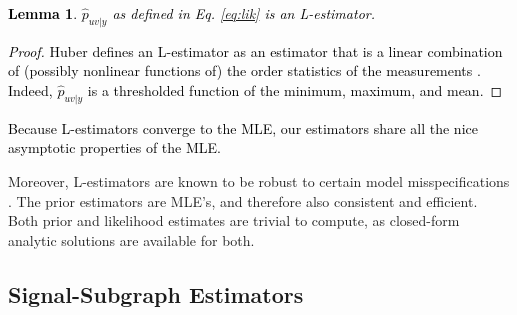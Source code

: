 \documentclass[10pt,journal,cspaper,compsoc]{IEEEtran}
\providecommand{\tk}[1]{\textcolor{black}{#1}}
\providecommand{\wh}[1]{\widehat{#1}}
\newcommand{\conv}{\rightarrow}
\newtheorem{Lem}{Lemma}[section]
\begin{document}
\tk{
\begin{Lem}
	$\wh{p}_{uv|y}$ as defined in Eq. \ref{eq:lik}  is an L-estimator.
\end{Lem}
% 
\begin{proof}
Huber defines an L-estimator as an estimator that is a linear combination of (possibly nonlinear functions of) the order statistics of the measurements \cite{Huber1981}.  Indeed, $\wh{p}_{uv|y}$ is a thresholded function of the minimum, maximum, and mean.
\end{proof}
% 
Because L-estimators converge to the MLE, our estimators share all the nice asymptotic properties of the MLE.  }
% 
% 
Moreover, L-estimators are known to be robust to certain model misspecifications \cite{Huber1981}. The prior estimators are MLE's, and therefore also consistent and efficient.
% 
% 
% 
Both prior and likelihood estimates are trivial to compute, as closed-form analytic solutions are available for both.  %

\subsection{Signal-Subgraph Estimators} %
\label{ssub:subsubsection_name5}
\end{document}
